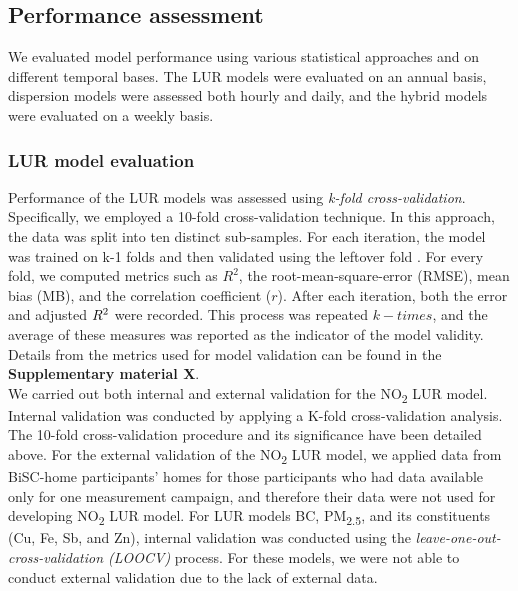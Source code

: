 \documentclass{article}
\begin{document}
\subsection{Performance assessment}

We evaluated model performance using various statistical approaches and on different temporal bases. The LUR models were evaluated on an annual basis, dispersion models were assessed both hourly and daily, and the hybrid models were evaluated on a weekly basis.

\subsubsection{LUR model evaluation}
Performance of the LUR models was assessed using \textit{k-fold cross-validation}. Specifically, we employed a 10-fold cross-validation technique. In this approach, the data was split into ten distinct sub-samples. For each iteration, the model was trained on k-1 folds and then validated using the leftover fold \cite{ziegel2003}. For every fold, we computed metrics such as \(R^2\), the root-mean-square-error (RMSE), mean bias (MB), and the correlation coefficient (\(r\)). After each iteration, both the error and adjusted \(R\textsuperscript{2}\) were recorded. This process was repeated \(k-times\), and the average of these measures was reported as the indicator of the model validity. Details from the metrics used for model validation can be found in the \textbf{Supplementary material X}.\\

We carried out both internal and external validation for the NO\textsubscript{2} LUR model. Internal validation was conducted by applying a K-fold cross-validation analysis. The 10-fold cross-validation procedure and its significance have been detailed above. For the external validation of the NO\textsubscript{2} LUR model, we applied data from BiSC-home participants' homes for those participants who had data available only for one measurement campaign, and therefore their data were not used for developing NO\textsubscript{2} LUR model. For LUR models BC, PM\textsubscript{2.5}, and its constituents (Cu, Fe, Sb, and Zn), internal validation was conducted using the \textit{leave-one-out-cross-validation (LOOCV)} process. For these models, we were not able to conduct external validation due to the lack of external data.
\end{document}
